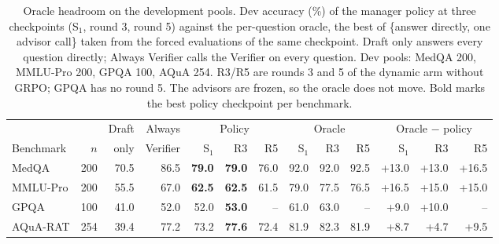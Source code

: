 \begin{table}[t]
\centering
\small
\setlength{\tabcolsep}{4.5pt}
\caption{Oracle headroom on the development pools. Dev accuracy (\%) of the manager policy at three checkpoints (S$_1$, round 3, round 5) against the per-question oracle, the best of \{answer directly, one advisor call\} taken from the forced evaluations of the same checkpoint. Draft only answers every question directly; Always Verifier calls the Verifier on every question. Dev pools: MedQA 200, MMLU-Pro 200, GPQA 100, AQuA 254. R3/R5 are rounds 3 and 5 of the dynamic arm without GRPO; GPQA has no round 5. The advisors are frozen, so the oracle does not move. Bold marks the best policy checkpoint per benchmark.}
\label{tab:oracle}
\begin{tabular}{l r r r rrr rrr rrr}
\toprule
 & & Draft & Always & \multicolumn{3}{c}{Policy} & \multicolumn{3}{c}{Oracle} & \multicolumn{3}{c}{Oracle $-$ policy} \\
\cmidrule(lr){5-7} \cmidrule(lr){8-10} \cmidrule(lr){11-13}
Benchmark & $n$ & only & Verifier & S$_1$ & R3 & R5 & S$_1$ & R3 & R5 & S$_1$ & R3 & R5 \\
\midrule
MedQA & 200 & 70.5 & 86.5 & \textbf{79.0} & \textbf{79.0} & 76.0 & 92.0 & 92.0 & 92.5 & +13.0 & +13.0 & +16.5 \\
MMLU-Pro & 200 & 55.5 & 67.0 & \textbf{62.5} & \textbf{62.5} & 61.5 & 79.0 & 77.5 & 76.5 & +16.5 & +15.0 & +15.0 \\
GPQA & 100 & 41.0 & 52.0 & 52.0 & \textbf{53.0} & -- & 61.0 & 63.0 & -- & +9.0 & +10.0 & -- \\
AQuA-RAT & 254 & 39.4 & 77.2 & 73.2 & \textbf{77.6} & 72.4 & 81.9 & 82.3 & 81.9 & +8.7 & +4.7 & +9.5 \\
\bottomrule
\end{tabular}
\end{table}
